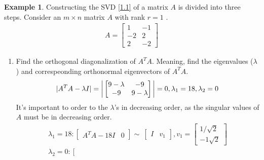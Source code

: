 \documentclass[12pt, reqno]{amsart}
\theoremstyle{definition}
\newtheorem{example}[theorem]{Example}
\theoremstyle{remark}
\numberwithin{equation}{section}
\begin{document}
\begin{example}
    Constructing the SVD \eqref{1.1} of a matrix $A$ is divided into three steps. Consider an $m \times n$ matrix $A$ with rank $r = 1$ \cite{Serrano}.
    \begin{align*}
        A = 
        \begin{bmatrix}
            1 & -1\\
            -2 & 2\\
            2 & -2
        \end{bmatrix}
    \end{align*}
    \begin{enumerate}
        \item Find the orthogonal diagonalization of $A^TA$. Meaning, find the eigenvalues ($\lambda$) and correspeonding orthonormal eigenvectors of $A^TA$.
            \begin{equation}
                |A^TA - \lambda I| = \bigg|
                \begin{bmatrix}
                    9-\lambda & -9\\
                    -9 & 9-\lambda
                \end{bmatrix}\bigg| = 0, \\
                \lambda_1 = 18, \lambda_2 = 0
            \end{equation}
            It's important to order to the $\lambda$'s in decreasing order, as the singular values of $A$ must be in decreasing order.
            \begin{equation}
                \begin{split}
                    \lambda_1 = 18: 
                    \left[
                        \begin{array}{c|c}
                        A^TA - 18I & 0
                        \end{array}
                    \right]
                    \sim\
                    \left[
                        \begin{array}{c|c}
                        I & v_1
                        \end{array}
                    \right],
                    v_1 = \begin{bmatrix}
                        1/\sqrt{2}\\
                        -1\sqrt{2}
                    \end{bmatrix}\\
                    \lambda_2 = 0: 
                    \left[

\end{split}
\end{equation}
\end{enumerate}
\end{example}
\end{document}
